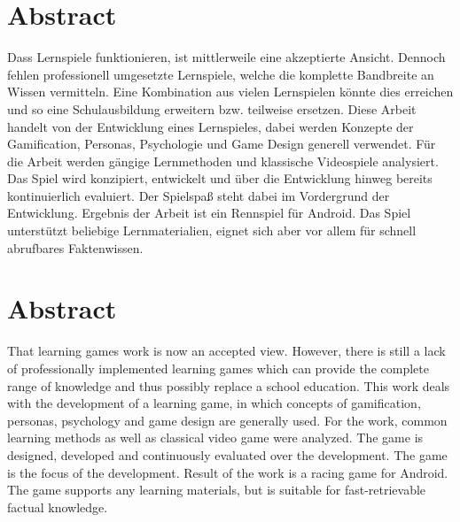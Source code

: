 \section*{Abstract}
Dass Lernspiele funktionieren, ist mittlerweile eine akzeptierte Ansicht. Dennoch fehlen professionell umgesetzte Lernspiele, welche die komplette Bandbreite an Wissen vermitteln. Eine Kombination aus vielen Lernspielen könnte dies erreichen und so eine Schulausbildung erweitern bzw. teilweise ersetzen.
Diese Arbeit handelt von der Entwicklung eines Lernspieles, dabei werden Konzepte der Gamification, Personas, Psychologie und Game Design generell verwendet. Für die Arbeit werden gängige Lernmethoden und klassische Videospiele analysiert. Das Spiel wird konzipiert, entwickelt und über die Entwicklung hinweg bereits kontinuierlich evaluiert. Der Spielspaß steht dabei im Vordergrund der Entwicklung.
Ergebnis der Arbeit ist ein Rennspiel für Android. Das Spiel unterstützt beliebige Lernmaterialien, eignet sich aber vor allem für schnell abrufbares Faktenwissen.

\vfill

\section*{Abstract}
That learning games work is now an accepted view. However, there is still a lack of professionally implemented learning games which can provide the complete range of knowledge and thus possibly replace a school education.
This work deals with the development of a learning game, in which concepts of gamification, personas, psychology and game design are generally used. For the work, common learning methods as well as classical video game were analyzed. The game is designed, developed and continuously evaluated over the development. The game is the focus of the development.
Result of the work is a racing game for Android. The game supports any learning materials, but is suitable for fast-retrievable factual knowledge.

\vfill\vfill\newpage
